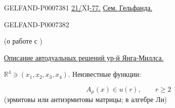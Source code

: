 \begin{GelfandAdjacentEvidence}{GELFAND-P000738}{1}
\noindent\underline{\underline{21/\(\overline{\underline{\mathrm{XI}}}\)-77.}}\qquad
\underline{\underline{Сем. Гельфанда.}}

\end{GelfandAdjacentEvidence}
\begin{GelfandAdjacentEvidence}{GELFAND-P000738}{2}


(о работе с )

\underline{Описание автодуальных решений ур-й Янга-Миллса.}

\(\mathbb R^4\ni(x_1,x_2,x_3,x_4)\). \qquad Неизвестные функции:

\[
A_\mu(x)\in u(r),\qquad r\geq 2
\]
(эрмитовы или антиэрмитовы матрицы; в алгебре Ли)
\end{GelfandAdjacentEvidence}
